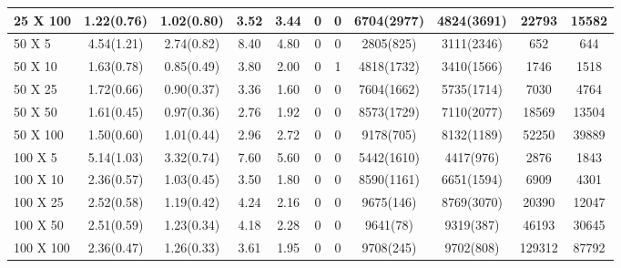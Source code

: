 \begin{table*}[htb]
\begin{tabularx}{430pt}{X*{10}{c}}
25 X 100 & 1.22(0.76) & 1.02(0.80) & 3.52 & 3.44 & 0 & 0 & 6704(2977) & 4824(3691) & 22793 & 15582 \\
\midrule
50 X 5 & 4.54(1.21) & 2.74(0.82) & 8.40 & 4.80 & 0 & 0 & 2805(825) & 3111(2346) & 652 & 644 \\
50 X 10 & 1.63(0.78) & 0.85(0.49) & 3.80 & 2.00 & 0 & 1 & 4818(1732) & 3410(1566) & 1746 & 1518 \\
50 X 25 & 1.72(0.66) & 0.90(0.37) & 3.36 & 1.60 & 0 & 0 & 7604(1662) & 5735(1714) & 7030 & 4764 \\
50 X 50 & 1.61(0.45) & 0.97(0.36) & 2.76 & 1.92 & 0 & 0 & 8573(1729) & 7110(2077) & 18569 & 13504 \\
50 X 100 & 1.50(0.60) & 1.01(0.44) & 2.96 & 2.72 & 0 & 0 & 9178(705) & 8132(1189) & 52250 & 39889 \\
\midrule
100 X 5 & 5.14(1.03) & 3.32(0.74) & 7.60 & 5.60 & 0 & 0 & 5442(1610) & 4417(976) & 2876 & 1843 \\
100 X 10 & 2.36(0.57) & 1.03(0.45) & 3.50 & 1.80 & 0 & 0 & 8590(1161) & 6651(1594) & 6909 & 4301 \\
100 X 25 & 2.52(0.58) & 1.19(0.42) & 4.24 & 2.16 & 0 & 0 & 9675(146) & 8769(3070) & 20390 & 12047 \\
100 X 50 & 2.51(0.59) & 1.23(0.34) & 4.18 & 2.28 & 0 & 0 & 9641(78) & 9319(387) & 46193 & 30645 \\
100 X 100 & 2.36(0.47) & 1.26(0.33) & 3.61 & 1.95 & 0 & 0 & 9708(245) & 9702(808) & 129312 & 87792 \\
\bottomrule
\end{tabularx}
\end{table*}

